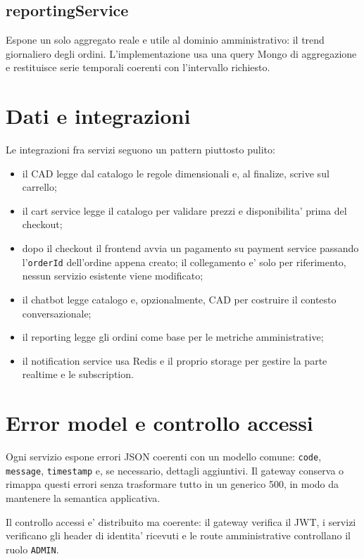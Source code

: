 \subsection{reportingService}
Espone un solo aggregato reale e utile al dominio amministrativo: il trend giornaliero degli ordini. L'implementazione usa una query Mongo di aggregazione e restituisce serie temporali coerenti con l'intervallo richiesto.

\section{Dati e integrazioni}

Le integrazioni fra servizi seguono un pattern piuttosto pulito:

\begin{itemize}
\item il CAD legge dal catalogo le regole dimensionali e, al finalize, scrive sul carrello;
\item il cart service legge il catalogo per validare prezzi e disponibilita' prima del checkout;
\item dopo il checkout il frontend avvia un pagamento su payment service passando l'\texttt{orderId} dell'ordine appena creato; il collegamento e' solo per riferimento, nessun servizio esistente viene modificato;
\item il chatbot legge catalogo e, opzionalmente, CAD per costruire il contesto conversazionale;
\item il reporting legge gli ordini come base per le metriche amministrative;
\item il notification service usa Redis e il proprio storage per gestire la parte realtime e le subscription.
\end{itemize}

\section{Error model e controllo accessi}

Ogni servizio espone errori JSON coerenti con un modello comune: \texttt{code}, \texttt{message}, \texttt{timestamp} e, se necessario, dettagli aggiuntivi. Il gateway conserva o rimappa questi errori senza trasformare tutto in un generico 500, in modo da mantenere la semantica applicativa.

Il controllo accessi e' distribuito ma coerente: il gateway verifica il JWT, i servizi verificano gli header di identita' ricevuti e le route amministrative controllano il ruolo \texttt{ADMIN}.
